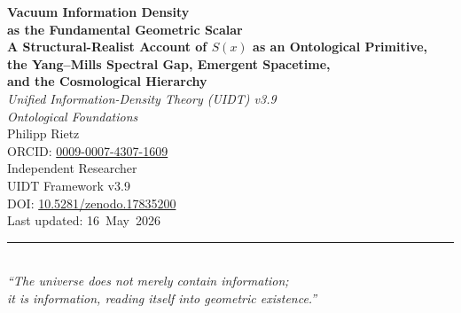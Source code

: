 \documentclass[12pt,a4paper,twoside]{article}
\theoremstyle{plain}
\theoremstyle{definition}
\theoremstyle{remark}
\begin{document}
\pagestyle{uidtontology}

\begin{titlepage}
\vspace*{2cm}
\begin{center}
{\LARGE\bfseries Vacuum Information Density\\[0.25em]
as the Fundamental Geometric Scalar}\\[0.9em]
{\small\bfseries A Structural-Realist Account of \(S(x)\) as an Ontological Primitive,\\[0.25em]
the Yang--Mills Spectral Gap, Emergent Spacetime,\\[0.25em]
and the Cosmological Hierarchy}\\[1.5em]
{\large\itshape Unified Information-Density Theory (UIDT) v3.9\\[0.25em]
Ontological Foundations}\\[3em]
{\Large Philipp Rietz}\\[0.5em]
{\small ORCID: \href{https://orcid.org/0009-0007-4307-1609}{0009-0007-4307-1609}}\\[0.2em]
{\small Independent Researcher}\\[4em]
{\normalsize UIDT Framework v3.9}\\[0.5em]
{\small DOI: \href{https://doi.org/10.5281/zenodo.17835200}{10.5281/zenodo.17835200}}\\[0.5em]
{\small Last updated: 16~May~2026}\\[4em]
\rule{0.6\textwidth}{0.4pt}\\[1em]
{\small\itshape ``The universe does not merely contain information;\\
it \emph{is} information, reading itself into geometric existence.''}
\end{center}
\end{titlepage}

\newpage
\tableofcontents
\newpage
\end{document}
